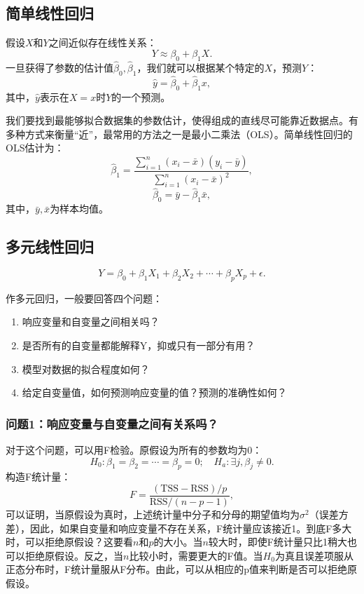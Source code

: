\documentclass[hyperref,]{ctexart}
\providecommand{\tightlist}{%
  \setlength{\itemsep}{0pt}\setlength{\parskip}{0pt}}
\begin{document}
\subsection{简单线性回归}

假设\(X\)和\(Y\)之间近似存在线性关系： \[Y\approx \beta_0 + \beta_1 X.\]
一旦获得了参数的估计值\(\hat{\beta}_0,\hat{\beta}_1\)，我们就可以根据某个特定的\(X\)，预测\(Y\)：
\[\hat{y}=\hat{\beta}_0 + \hat{\beta}_1 x,\]
其中，\(\hat{y}\)表示在\(X=x\)时\(Y\)的一个预测。

我们要找到最能够拟合数据集的参数估计，使得组成的直线尽可能靠近数据点。有多种方式来衡量``近''，最常用的方法之一是最小二乘法（OLS）。简单线性回归的OLS估计为：
\[\hat{\beta}_1 = \frac{\sum_{i=1}^n (x_i -\bar{x})(y_i - \bar{y})}{\sum_{i=1}^n (x_i - \bar{x})^2},\]
\[\hat{\beta}_0 = \bar{y} - \hat{\beta}_1 \bar{x},\]
其中，\(\bar{y},\bar{x}\)为样本均值。

\subsection{多元线性回归}

\[Y=\beta_0 + \beta_1 X_1 + \beta_2 X_2 + \cdots + \beta_p X_p + \epsilon.\]

作多元回归，一般要回答四个问题：

\begin{enumerate}
\def\labelenumi{\arabic{enumi}.}
\tightlist
\item
  响应变量和自变量之间相关吗？
\item
  是否所有的自变量都能解释Y，抑或只有一部分有用？
\item
  模型对数据的拟合程度如何？
\item
  给定自变量值，如何预测响应变量的值？预测的准确性如何？
\end{enumerate}

\subsubsection{问题1：响应变量与自变量之间有关系吗？}\label{1}

对于这个问题，可以用F检验。原假设为所有的参数均为0：
\[ H_0:\beta_1 = \beta_2 = \cdots = \beta_p = 0;\quad H_a: \exists j,\beta_j\neq 0.\]
构造F统计量：
\[F=\frac{(\mathrm{TSS}-\mathrm{RSS})/p}{\mathrm{RSS}/(n-p-1)},\]
可以证明，当原假设为真时，上述统计量中分子和分母的期望值均为\(\sigma^2\)（误差方差），因此，如果自变量和响应变量不存在关系，F统计量应该接近1。到底F多大时，可以拒绝原假设？这要看\(n\)和\(p\)的大小。当\(n\)较大时，即使F统计量只比1稍大也可以拒绝原假设。反之，当\(n\)比较小时，需要更大的F值。当\(H_0\)为真且误差项服从正态分布时，F统计量服从F分布。由此，可以从相应的p值来判断是否可以拒绝原假设。
\end{document}
